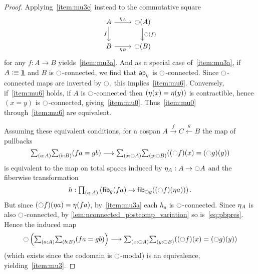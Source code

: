 \begin{proof}
  Applying~\ref{item:mu3c} instead to the commutative square
  \begin{equation}
  \begin{tikzcd}
  A \arrow[r,"{\modalunit[A]}"] \arrow[d,swap,"f"] 
    & \modal(A) \arrow[d,"\modal(f)"] \\
  B \arrow[r,swap,"{\modalunit[B]}"]
    & \modal(B)
  \end{tikzcd}
  \end{equation}
  for any $f:A\to B$ yields~\ref{item:mu3a}.
  And as a special case of~\ref{item:mu3a}, if $A\defeq \unit$ and $B$ is $\modal$-connected, we find that $\apfunc{\modalunit}$ is $\modal$-connected.
  Since $\modal$-connected maps are inverted by $\modal$, this implies~\ref{item:mu6}.
  Conversely, if~\ref{item:mu6} holds, if $A$ is $\modal$-connected then $(\modalunit(x)=\modalunit(y))$ is contractible, hence $(x=y)$ is $\modal$-connected, giving~\ref{item:mu0}.
  Thus~\ref{item:mu0} through~\ref{item:mu6} are equivalent.

  Assuming these equivalent conditions, for a cospan $A\xrightarrow{f}C \xleftarrow{g} B$ the map of pullbacks
  \begin{equation}
    \sm{a:A}{b:B} (fa=gb) \longrightarrow \sm{x:\modal A}{y:\modal B} ((\modal f)(x) = (\modal g)(y))\label{eq:pbpres}
  \end{equation}
  is equivalent to the map on total spaces induced by $\modalunit[A]:A\to\modal A$ and the fiberwise transformation
  \[ h : \prd{a:A} \left(\fib{g}{fa} \to \fib{\modal g}{(\modal f)(\modalunit a)}\right). \]
  But since $(\modal f)(\modalunit a) = \modalunit(fa)$, by~\ref{item:mu3a} each $h_a$ is $\modal$-connected.
  Since $\modalunit[A]$ is also $\modal$-connected, by \cref{lem:nconnected_postcomp_variation} so is~\eqref{eq:pbpres}.
  Hence the induced map
  \[ \modal\left(\sm{a:A}{b:B} (fa=gb)\right) \longrightarrow \sm{x:\modal A}{y:\modal B} ((\modal f)(x) = (\modal g)(y))\]
  (which exists since the codomain is $\modal$-modal) is an equivalence, yielding~\ref{item:mu3}.


\end{proof}
